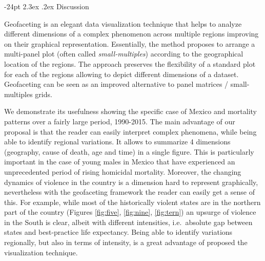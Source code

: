 \documentclass[10pt, twoside, parskip=half]{article}
\makeatletter
\renewcommand\section{\@startsection {section}{1}{\z@}%
                                   {-24pt}%
                                   {2.3ex \@plus.2ex}%
                                   {\normalfont\large\bfseries}}
\makeatother
\begin{document}
\hypertarget{discussion}{%
\section{Discussion}\label{discussion}}

Geofaceting is an elegant data visualization technique that helps to analyze different dimensions of a complex phenomenon across multiple regions improving on their graphical representation. Essentially, the method proposes to arrange a multi-panel plot (often called \emph{small-multiples}) according to the geographical location of the regions. The approach preserves the flexibility of a standard plot for each of the regions allowing to depict different dimensions of a dataset. Geofaceting can be seen as an improved alternative to panel matrices / small-multiples grids.

We demonstrate its usefulness showing the specific case of Mexico and mortality patterns over a fairly large period, 1990-2015. The main advantage of our proposal is that the reader can easily interpret complex phenomena, while being able to identify regional variations. It allows to summarize 4 dimensions (geography, cause of death, age and time) in a single figure. This is particularly important in the case of young males in Mexico that have experienced an unprecedented period of rising homicidal mortality. Moreover, the changing dynamics of violence in the country is a dimension hard to represent graphically, nevertheless with the geofaceting framework the reader can easily get a sense of this. For example, while most of the historically violent states are in the northern part of the country (Figures \ref{fig:five}, \ref{fig:nine}, \ref{fig:tern}) an upsurge of violence in the South is clear, albeit with different intensities, i.e.~absolute gap between states and best-practice life expectancy. Being able to identify variations regionally, but also in terms of intensity, is a great advantage of proposed the visualization technique.
\end{document}
